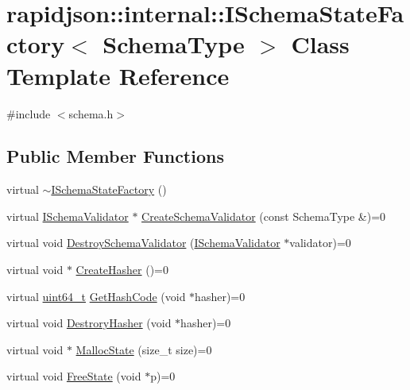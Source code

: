 \hypertarget{classrapidjson_1_1internal_1_1_i_schema_state_factory}{}\section{rapidjson\+::internal\+::I\+Schema\+State\+Factory$<$ Schema\+Type $>$ Class Template Reference}
\label{classrapidjson_1_1internal_1_1_i_schema_state_factory}


{\ttfamily \#include $<$schema.\+h$>$}

\subsection*{Public Member Functions}
\begin{DoxyCompactItemize}
\item 
virtual \mbox{\hyperlink{classrapidjson_1_1internal_1_1_i_schema_state_factory_a2f91d2ea192049dd2087a73768f55934}{$\sim$\+I\+Schema\+State\+Factory}} ()
\item 
virtual \mbox{\hyperlink{classrapidjson_1_1internal_1_1_i_schema_validator}{I\+Schema\+Validator}} $\ast$ \mbox{\hyperlink{classrapidjson_1_1internal_1_1_i_schema_state_factory_af6301e6b139b66414e48e5ecf8f2fb87}{Create\+Schema\+Validator}} (const Schema\+Type \&)=0
\item 
virtual void \mbox{\hyperlink{classrapidjson_1_1internal_1_1_i_schema_state_factory_ac4a27b4a68e9910e2cde81e9ffc0f3a9}{Destroy\+Schema\+Validator}} (\mbox{\hyperlink{classrapidjson_1_1internal_1_1_i_schema_validator}{I\+Schema\+Validator}} $\ast$validator)=0
\item 
virtual void $\ast$ \mbox{\hyperlink{classrapidjson_1_1internal_1_1_i_schema_state_factory_a399e25fa32d89a112518edbd8f9a9616}{Create\+Hasher}} ()=0
\item 
virtual \mbox{\hyperlink{stdint_8h_aec6fcb673ff035718c238c8c9d544c47}{uint64\+\_\+t}} \mbox{\hyperlink{classrapidjson_1_1internal_1_1_i_schema_state_factory_afc18fb7b00f13e9fe4505b75e0a23d5d}{Get\+Hash\+Code}} (void $\ast$hasher)=0
\item 
virtual void \mbox{\hyperlink{classrapidjson_1_1internal_1_1_i_schema_state_factory_abda4f78e5673367fd2bc51c1743d8620}{Destrory\+Hasher}} (void $\ast$hasher)=0
\item 
virtual void $\ast$ \mbox{\hyperlink{classrapidjson_1_1internal_1_1_i_schema_state_factory_a9804f3ef559cb1262a67d3a63bc1f77a}{Malloc\+State}} (size\+\_\+t size)=0
\item 
virtual void \mbox{\hyperlink{classrapidjson_1_1internal_1_1_i_schema_state_factory_af986c4556f9fbec6980648f0021d31d8}{Free\+State}} (void $\ast$p)=0
\end{DoxyCompactItemize}


